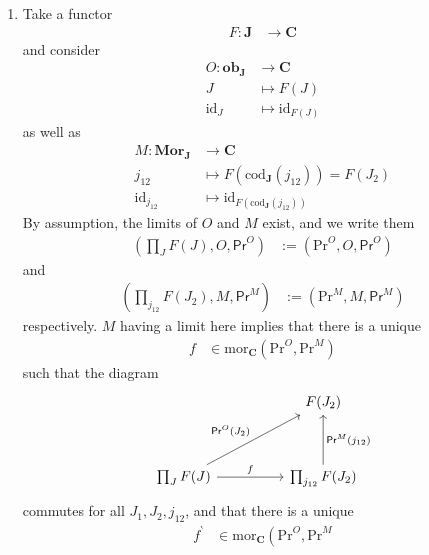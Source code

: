 \begin{prf}
\begin{enumerate}
\item[(1T)]
Take a functor
\begin{align*}
  F
  \colon
  \mathbf{J}
  &\rightarrow
  \mathbf{C}
\end{align*}
and consider
\begin{align*}
  O
  \colon
  \mathbf{ob}_{\mathbf{J}}
  &\rightarrow
  \mathbf{C}
  \\
  J
  &\mapsto
  F(J)
  \\
  \mathrm{id}_{J}
  &\mapsto
  \mathrm{id}_{F(J)}
\end{align*}
as well as
\begin{align*}
  M
  \colon
  \mathbf{Mor}_{\mathbf{J}}
  &\rightarrow
  \mathbf{C}
  \\
  j_{12}
  &\mapsto
  F(\mathrm{cod}_{\mathbf{J}}(j_{12}))
  =
  F(J_{2})
  \\
  \mathrm{id}_{j_{12}}
  &\mapsto
  \mathrm{id}_{F(\mathrm{cod}_{\mathbf{J}}(j_{12}))}
\end{align*}
By assumption, the limits of $O$ and $M$ exist, and we write them
\begin{align*}
  \left(
    \prod_{J}F(J),
    O,
    \mathsf{Pr}^{O}
  \right)
  &:=
  \left(
    \mathrm{Pr}^{O},
    O,
    \mathsf{Pr}^{O}
  \right)
\end{align*}
and
\begin{align*}
  \left(
    \prod_{j_{12}}F(J_{2}),
    M,
    \mathsf{Pr}^{M}
  \right)
  &:=
  \left(
    \mathrm{Pr}^{M},
    M,
    \mathsf{Pr}^{M}
  \right)
\end{align*}
respectively.
$M$ having a limit here implies that there is a unique
\begin{align*}
  f
  &\in
  \mathrm{mor}_{\mathbf{C}}
  \left(
    \mathrm{Pr}^{O},
    \mathrm{Pr}^{M}
  \right)
\end{align*}
such that the diagram
\[
\begin{tikzcd}[sep=normal]
  &
  &
  F(J_{2})
  \\
  &&
  \\
  \prod_{J}F(J)
  \arrow{uurr}{\mathsf{Pr}^{O}(J_{2})}
  \arrow{rr}{f}
  &
  &
  \prod_{j_{12}}F(J_{2})
  \arrow[swap]{uu}{\mathsf{Pr}^{M}(j_{12})}
\end{tikzcd}
\]
commutes for all $J_{1},J_{2},j_{12}$, and that there is a unique
\begin{align*}
  f^{\backprime}
  &\in
  \mathrm{mor}_{\mathbf{C}}
  \left(
    \mathrm{Pr}^{O},
    \mathrm{Pr}^{M}

\end{align*}
\end{enumerate}
\end{prf}
